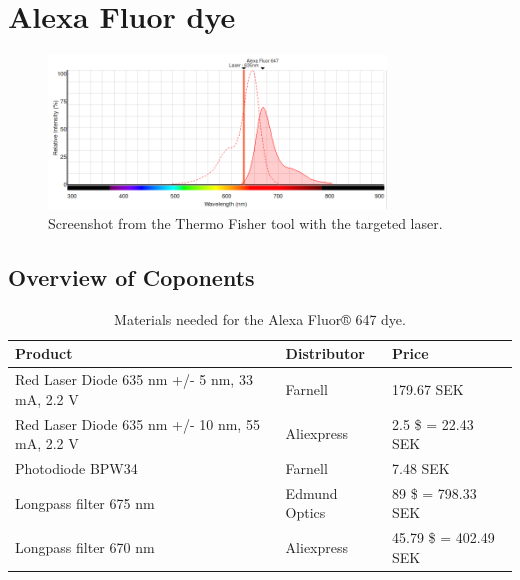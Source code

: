 \documentclass{article}
\begin{document}
\pagestyle{fancy}

\section{Alexa Fluor dye}

\begin{figure}[H]
	\centering
	\includegraphics[width=0.8\textwidth]{./fig/spectrum_alexa_647_laser_635}
	\caption{Screenshot from the Thermo Fisher tool with the targeted laser.}
	\label{fig:alexa_647}
\end{figure}

\subsection{Overview of Coponents}
\begin{table}[H]
\centering
\begin{tabular}{lll}
\hline
\textbf{Product}                               & \textbf{Distributor} & \textbf{Price} \\\hline
Red Laser Diode 635 nm +/- 5 nm, 33 mA, 2.2 V  & Farnell         & 179.67 SEK     \\
Red Laser Diode 635 nm +/- 10 nm, 55 mA, 2.2 V & Aliexpress      & 2.5 \$ = 22.43 SEK \\
Photodiode BPW34                               & Farnell         & 7.48 SEK       \\
Longpass filter 675 nm                         & Edmund Optics   & 89 \$ = 798.33 SEK \\
Longpass filter 670 nm                         & Aliexpress      & 45.79 \$ = 402.49 SEK \\\hline
\end{tabular}
\caption{Materials needed for the Alexa Fluor® 647 dye.}
\label{tab:647}
\end{table}
\end{document}
